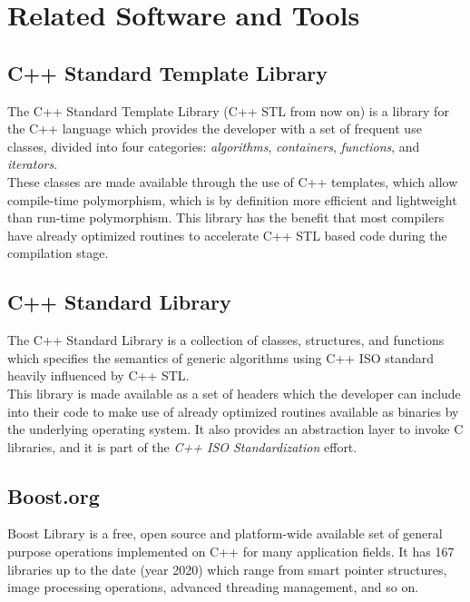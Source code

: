 \section{Related Software and Tools}

\subsection{C++ Standard Template Library}

The C++ Standard Template Library (C++ STL from now on) is a library for the C++ language which provides the developer with a set of frequent use classes, divided into four categories: \textit{algorithms}, \textit{containers}, \textit{functions}, and \textit{iterators}. \\

These classes are made available through the use of C++ templates, which allow compile-time polymorphism, which is by definition more efficient and lightweight than run-time polymorphism. This library has the benefit that most compilers have already optimized routines to accelerate C++ STL based code during the compilation stage.\\

\subsection{C++ Standard Library}

The C++ Standard Library is a collection of classes, structures, and functions which specifies the semantics of generic algorithms using C++ ISO standard heavily influenced by C++ STL. \\

This library is made available as a set of headers which the developer can include into their code to make use of already optimized routines available as binaries by the underlying operating system. It also provides an abstraction layer to invoke C libraries, and it is part of the \textit{C++ ISO Standardization} effort.\\

\subsection{Boost.org}

Boost Library is a free, open source and platform-wide available set of general purpose operations implemented on C++ for many application fields. It has 167 libraries up to the date (year 2020) which range from smart pointer structures, image processing operations, advanced threading management, and so on. \\

